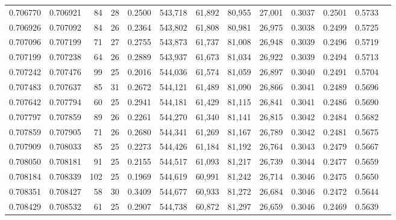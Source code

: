 \begin{tabular}{rrrrrrrrrrrrr}
0.706770 & 0.706921 &    84 &  28 &                                     0.2500 & 543,718 &  61,892 &  80,955 &  27,001 & 0.3037 & 0.2501 & 0.5733 \\
0.706926 & 0.707092 &    84 &  26 &                                     0.2364 & 543,802 &  61,808 &  80,981 &  26,975 & 0.3038 & 0.2499 & 0.5725 \\
0.707096 & 0.707199 &    71 &  27 &                                     0.2755 & 543,873 &  61,737 &  81,008 &  26,948 & 0.3039 & 0.2496 & 0.5719 \\
0.707199 & 0.707238 &    64 &  26 &                                     0.2889 & 543,937 &  61,673 &  81,034 &  26,922 & 0.3039 & 0.2494 & 0.5713 \\
0.707242 & 0.707476 &    99 &  25 &                                     0.2016 & 544,036 &  61,574 &  81,059 &  26,897 & 0.3040 & 0.2491 & 0.5704 \\
0.707483 & 0.707637 &    85 &  31 &                                     0.2672 & 544,121 &  61,489 &  81,090 &  26,866 & 0.3041 & 0.2489 & 0.5696 \\
0.707642 & 0.707794 &    60 &  25 &                                     0.2941 & 544,181 &  61,429 &  81,115 &  26,841 & 0.3041 & 0.2486 & 0.5690 \\
0.707797 & 0.707859 &    89 &  26 &                                     0.2261 & 544,270 &  61,340 &  81,141 &  26,815 & 0.3042 & 0.2484 & 0.5682 \\
0.707859 & 0.707905 &    71 &  26 &                                     0.2680 & 544,341 &  61,269 &  81,167 &  26,789 & 0.3042 & 0.2481 & 0.5675 \\
0.707909 & 0.708033 &    85 &  25 &                                     0.2273 & 544,426 &  61,184 &  81,192 &  26,764 & 0.3043 & 0.2479 & 0.5667 \\
0.708050 & 0.708181 &    91 &  25 &                                     0.2155 & 544,517 &  61,093 &  81,217 &  26,739 & 0.3044 & 0.2477 & 0.5659 \\
0.708184 & 0.708339 &   102 &  25 &                                     0.1969 & 544,619 &  60,991 &  81,242 &  26,714 & 0.3046 & 0.2475 & 0.5650 \\
0.708351 & 0.708427 &    58 &  30 &                                     0.3409 & 544,677 &  60,933 &  81,272 &  26,684 & 0.3046 & 0.2472 & 0.5644 \\
0.708429 & 0.708532 &    61 &  25 &                                     0.2907 & 544,738 &  60,872 &  81,297 &  26,659 & 0.3046 & 0.2469 & 0.5639 \\

\end{tabular}
